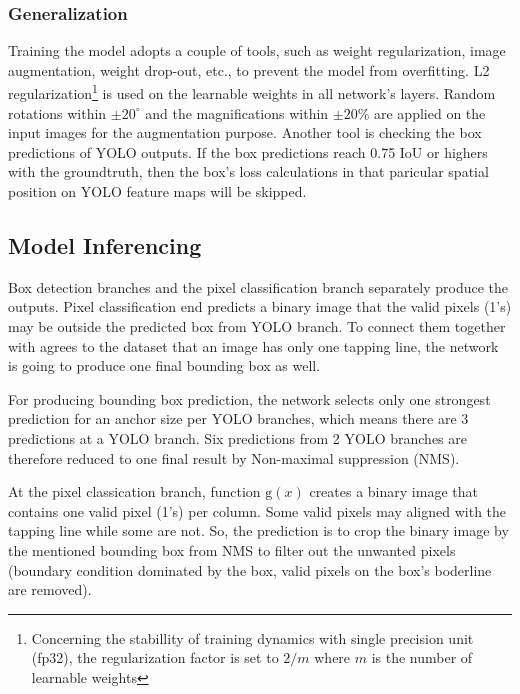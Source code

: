 \documentclass[default,pdflatex,iicol]{sn-jnl}%
\begin{document}
\subsubsection{Generalization}
Training the model adopts a couple of tools, such as weight regularization, image augmentation, weight drop-out, etc., to prevent the model from overfitting. L2 regularization\footnote[2]{Concerning the stabillity of training dynamics with single precision unit (fp32), the regularization factor is set to $2/m$ where $m$ is the number of learnable weights} is used on the learnable weights in all network's layers. Random rotations within $\pm20^\circ$ and the magnifications within $\pm20\%$ are applied on the input images for the augmentation purpose. Another tool is checking the box predictions of YOLO outputs. If the box predictions reach 0.75 IoU or highers with the groundtruth, then the box's loss calculations in that paricular spatial position on YOLO feature maps will be skipped.

\subsection{Model Inferencing}
Box detection branches and the pixel classification branch separately produce the outputs. Pixel classification end predicts a binary image that the valid pixels (1's) may be outside the predicted box from YOLO branch. To connect them together with agrees to the dataset that an image has only one tapping line, the network is going to produce one final bounding box as well.

For producing bounding box prediction, the network selects only one strongest prediction for an anchor size per YOLO branches, which means there are 3 predictions at a YOLO branch. Six predictions from 2 YOLO branches are therefore reduced to one final result by Non-maximal suppression (NMS).

At the pixel classication branch, function $\mathrm{g}(x)$ creates a binary image that contains one valid pixel (1's) per column. Some valid pixels may aligned with the tapping line while some are not. So, the prediction is to crop the binary image by the mentioned bounding box from NMS to filter out the unwanted pixels (boundary condition dominated by the box, valid pixels on the box's boderline are removed).
\end{document}
